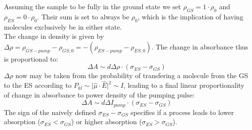\documentclass[twoside,openright]{scrreprt}
\begin{document}
Assuming the sample to be fully in the ground state we set $\rho _{GS} = 1\cdot \rho_0$ and $\rho_{ES} = 0 \cdot \rho_0$. Their sum is set to always be $\rho_0$, which is the implication of having molecules exclusively be in either state.\\
The change in density is given by $\Delta \rho = \rho_{GS-pump} - \rho_{GS,0} = - \left(\rho_{ES-pump} - \rho_{ES,0}\right)$. The change in absorbance thus is proportional to:
\begin{equation}
\Delta A \sim d \Delta \rho\cdot\left(\sigma_{ES}-\sigma_{GS}\right)
\end{equation}
$\Delta \rho$ now may be taken from the probability of transfering a molecule from the GS to the ES according to $P_{kl}\sim \lvert\hat{\mu}\cdot\hat{E}\rvert^2 \sim I$, leading to a final linear proportionality of change in absorbance to power density of the pumping pulse:
\begin{equation}
\Delta A \sim d \Delta I_{pump}\cdot\left(\sigma_{ES}-\sigma_{GS}\right)
\end{equation}
The sign of the naively defined $\sigma_{ES} - \sigma_{GS}$ specifies if a process leads to lower absorption ($\sigma_{ES} < \sigma_{GS}$) or higher absorption ($\sigma_{ES} > \sigma_{GS}$).




\end{document}
